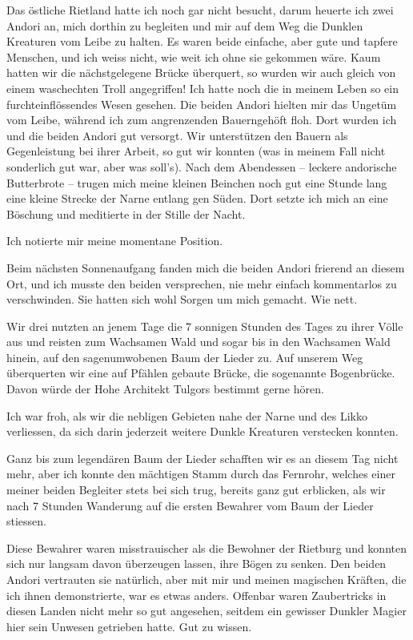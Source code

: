 Das östliche Rietland hatte ich noch gar nicht besucht, darum heuerte ich zwei Andori an, mich dorthin zu begleiten und mir auf dem Weg die Dunklen Kreaturen vom Leibe zu halten. Es waren beide einfache, aber gute und tapfere Menschen, und ich weiss nicht, wie weit ich ohne sie gekommen wäre. Kaum hatten wir die nächstgelegene Brücke überquert, so wurden wir auch gleich von einem waschechten Troll angegriffen! Ich hatte noch die in meinem Leben so ein furchteinflössendes Wesen gesehen. Die beiden Andori hielten mir das Ungetüm vom Leibe, während ich zum angrenzenden Bauerngehöft floh. Dort wurden ich und die beiden Andori gut versorgt. Wir unterstützen den Bauern als Gegenleistung bei ihrer Arbeit, so gut wir konnten (was in meinem Fall nicht sonderlich gut war, aber was soll’s). Nach dem Abendessen – leckere andorische Butterbrote – trugen mich meine kleinen Beinchen noch gut eine Stunde lang eine kleine Strecke der Narne entlang gen Süden. Dort setzte ich mich an eine Böschung und meditierte in der Stille der Nacht.

Ich notierte mir meine momentane Position.



\trennzeichen



Beim nächsten Sonnenaufgang fanden mich die beiden Andori frierend an diesem Ort, und ich musste den beiden versprechen, nie mehr einfach kommentarlos zu verschwinden. Sie hatten sich wohl Sorgen um mich gemacht. Wie nett.

Wir drei nutzten an jenem Tage die 7 sonnigen Stunden des Tages zu ihrer Völle aus und reisten zum Wachsamen Wald und sogar bis in den Wachsamen Wald hinein, auf den sagenumwobenen Baum der Lieder zu. Auf unserem Weg überquerten wir eine auf Pfählen gebaute Brücke, die sogenannte Bogenbrücke. Davon würde der Hohe Architekt Tulgors bestimmt gerne hören.

Ich war froh, als wir die nebligen Gebieten nahe der Narne und des Likko verliessen, da sich darin jederzeit weitere Dunkle Kreaturen verstecken konnten.

Ganz bis zum legendären Baum der Lieder schafften wir es an diesem Tag nicht mehr, aber ich konnte den mächtigen Stamm durch das Fernrohr, welches einer meiner beiden Begleiter stets bei sich trug, bereits ganz gut erblicken, als wir nach 7 Stunden Wanderung auf die ersten Bewahrer vom Baum der Lieder stiessen.

Diese Bewahrer waren misstrauischer als die Bewohner der Rietburg und konnten sich nur langsam davon überzeugen lassen, ihre Bögen zu senken. Den beiden Andori vertrauten sie natürlich, aber mit mir und meinen magischen Kräften, die ich ihnen demonstrierte, war es etwas anders. Offenbar waren Zaubertricks in diesen Landen nicht mehr so gut angesehen, seitdem ein gewisser Dunkler Magier hier sein Unwesen getrieben hatte. Gut zu wissen.

